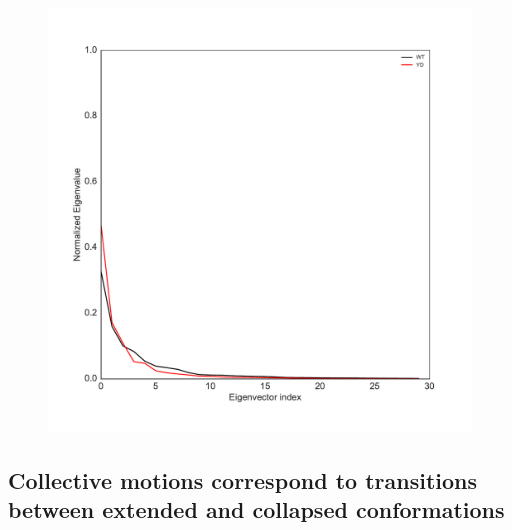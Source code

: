 \begin{figure}
\centering
	\includegraphics[height=0.5\textheight]{figures/eigenvals.pdf}
\end{figure}



\subsection{Collective motions correspond to transitions between extended and collapsed conformations}



